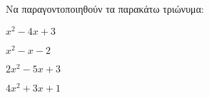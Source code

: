 Να παραγοντοποιηθούν τα παρακάτω τριώνυμα:
\begin{multicols}{2}
\begin{alist}
\item $ x^2-4x+3 $
\item $ x^2-x-2 $
\item $ 2x^2-5x+3 $
\item $ 4x^2+3x+1 $
\end{alist}
\end{multicols}
